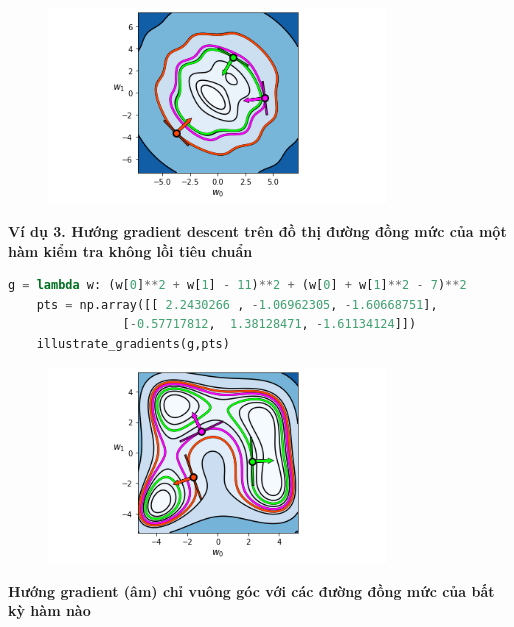 \documentclass{book}
\begin{document}
\begin{figure}[H]
    \centering
    \includegraphics[width=0.8\textwidth]{images/gradient_descent_direction_wavy_function.png}
\end{figure}
\textbf{Ví dụ 3. Hướng gradient descent trên đồ thị đường đồng mức của một hàm kiểm tra không lồi tiêu chuẩn}
\begin{lstlisting}[language=python]
    g = lambda w: (w[0]**2 + w[1] - 11)**2 + (w[0] + w[1]**2 - 7)**2
    pts = np.array([[ 2.2430266 , -1.06962305, -1.60668751],
                [-0.57717812,  1.38128471, -1.61134124]])
    illustrate_gradients(g,pts)
\end{lstlisting}
\begin{figure}[H]
    \centering
    \includegraphics[width=0.8\textwidth]{images/gradient_descent_direction_non_convex_function.png}
\end{figure}
\textbf{Hướng gradient (âm) chỉ vuông góc với các đường đồng mức của bất kỳ hàm nào}
\end{document}
